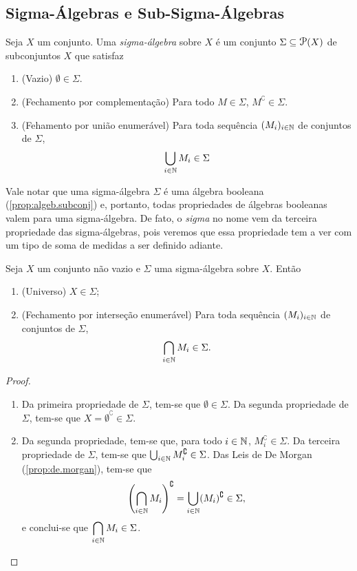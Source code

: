 \subsection{Sigma-Álgebras e Sub-Sigma-Álgebras}

\begin{defi}
	Seja $X$ um conjunto. Uma \emph{sigma-álgebra} sobre $X$ é um conjunto $\Sigma \subseteq \p(X)$ de subconjuntos $X$ que satisfaz
	\begin{enumerate}
	\item (Vazio) $\emptyset \in \Sigma$.
	\item (Fechamento por complementação) Para todo $M \in \Sigma$, $M^\complement \in \Sigma$.
	\item (Fehamento por união enumerável) Para toda sequência $(M_i)_{i \in \mathbb{N}}$ de conjuntos de $\Sigma$,
	\begin{equation*}
	\bigcup_{i \in \mathbb{N}} M_i \in \Sigma
	\end{equation*}
	\end{enumerate}
\end{defi}

	Vale notar que uma sigma-álgebra $\Sigma$ é uma álgebra booleana (\ref{prop:algeb.subconj}) e, portanto, todas propriedades de álgebras booleanas valem para uma sigma-álgebra. De fato, o \textit{sigma} no nome vem da terceira propriedade das sigma-álgebras, pois veremos que essa propriedade tem a ver com um tipo de soma de medidas a ser definido adiante.

\begin{prop}
	Seja $X$ um conjunto não vazio e $\Sigma$ uma sigma-álgebra sobre $X$. Então
	\begin{enumerate}
	\item (Universo) $X \in \Sigma$;
	\item (Fechamento por interseção enumerável) Para toda sequência $(M_i)_{i \in \mathbb{N}}$ de conjuntos de $\Sigma$,
	\begin{equation*}
	\bigcap_{i \in \mathbb{N}} M_i \in \Sigma.
	\end{equation*}
	\end{enumerate}
\end{prop}
\begin{proof}
	\begin{enumerate}
	\item Da primeira propriedade de $\Sigma$, tem-se que $\emptyset \in \Sigma$. Da segunda propriedade de $\Sigma$, tem-se que $X = \emptyset^\complement \in \Sigma$.
	\item Da segunda propriedade, tem-se que, para todo $i \in \mathbb{N}$, $M_i^\complement \in \Sigma$. Da terceira propriedade de $\Sigma$, tem-se que $\bigcup_{i \in \mathbb{N}} M_i^\complement \in \Sigma$. Das Leis de De Morgan (\ref{prop:de.morgan}), tem-se que
	\begin{equation*}
	\left(\bigcap_{i \in \mathbb{N}} M_i \right)^\complement = \bigcup_{i \in \mathbb{N}} (M_i)^\complement \in \Sigma,
	\end{equation*}
e conclui-se que $\displaystyle\bigcap_{i \in \mathbb{N}} M_i \in \Sigma$.
	\end{enumerate}
\end{proof}

